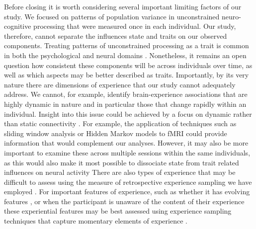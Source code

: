 Before closing it is worth considering several important limiting factors of our study. We focused on patterns of population variance in unconstrained neuro-cognitive processing that were measured once in each individual. Our study, therefore, cannot separate the influences state and traits on our observed components. Treating patterns of unconstrained processing as a trait is common in both the psychological \cite{McVay2009,SmallwoodCC2013}
and neural domains \cite{Smith2015}.
Nonetheless, it remains an open question how consistent these components will be across individuals over time, as well as which aspects may be better described as traits. Importantly, by its very nature there are dimensions of experience that our study cannot adequately address. We cannot, for example, identify brain-experience associations that are highly dynamic in nature and in particular those that change rapidly within an individual. Insight into this issue could be achieved by a focus on dynamic rather than static connectivity \cite{Kucyi2017}.
For example, the application of techniques such as sliding window analysis \cite{Chang2010}%
or Hidden Markov models \cite{Vidaurre2017}
to fMRI could provide information that would complement our analyses. However, it may also be more important to examine these across multiple sessions within the same individuals, as this would also make it most possible to dissociate state from trait related influences on neural activity \cite{Mueller2013}%
There are also types of experience that may be difficult to assess using the measure of retrospective experience sampling we have employed \cite{SmallwoodSchooler2015}.
For important features of experience, such as whether it has evolving features \cite{Mills2018},
or when the participant is unaware of the content of their experience \cite{Schooler2002}%
these experiential features may be best assessed using experience sampling techniques that capture momentary elements of experience \cite{Smallwood2013}. %

